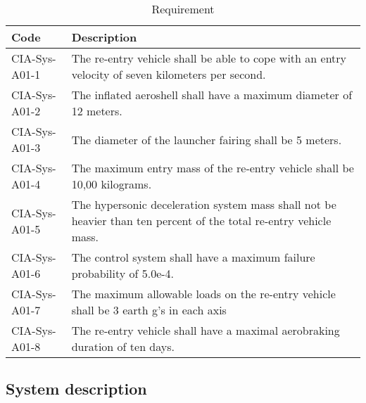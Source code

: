 \begin{table}[H]
	\caption{Requirement}
	\resizebox{16cm}{!} {
    \begin{tabular}{|l|l|}
    \hline
    Code          & Description                                                                                                      \\ \hline \hline
    CIA-Sys-A01-1 & The re-entry vehicle shall be able to cope with an entry velocity of seven kilometers per second.                \\ \hline
    CIA-Sys-A01-2 & The inflated aeroshell shall have a maximum diameter of 12 meters.                                               \\ \hline
    CIA-Sys-A01-3 & The diameter of the launcher fairing shall be 5 meters.                                                          \\ \hline
    CIA-Sys-A01-4 & The maximum entry mass of the re-entry vehicle shall be 10,00 kilograms.                                         \\ \hline
    CIA-Sys-A01-5 & The hypersonic deceleration system mass shall not be heavier than ten percent of the total re-entry vehicle mass. \\ \hline
    CIA-Sys-A01-6 & The control system shall have a maximum failure probability of 5.0e-4.                                           \\ \hline
    CIA-Sys-A01-7 & The maximum allowable loads on the re-entry vehicle shall be 3 earth g's in each axis                            \\ \hline
    CIA-Sys-A01-8 & The re-entry vehicle shall have a maximal aerobraking duration of ten days.                                      \\ \hline
    \end{tabular}
    }
    \label{tab:requirements}
\end{table}

\subsection{System description}

